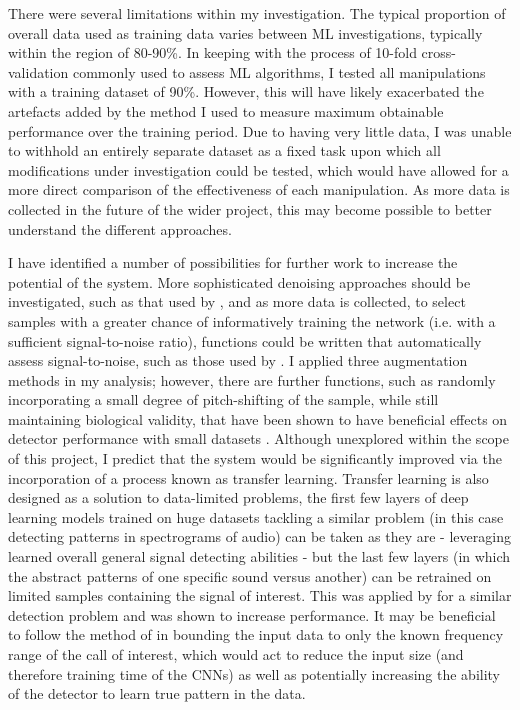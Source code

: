 \documentclass[11pt]{article}
\begin{document}
There were several limitations within my investigation. The typical proportion of overall data used as training data varies between ML investigations, typically within the region of 80-90\%. In keeping with the process of 10-fold cross-validation commonly used to assess ML algorithms, I tested all manipulations with a training dataset of 90\%. However, this will have likely exacerbated the artefacts added by the method I used to measure maximum obtainable performance over the training period. Due to having very little data, I was unable to withhold an entirely separate dataset as a fixed task upon which all modifications under investigation could be tested, which would have allowed for a more direct comparison of the effectiveness of each manipulation. As more data is collected in the future of the wider project, this may become possible to better understand the different approaches.

I have identified a number of possibilities for further work to increase the potential of the system. More sophisticated denoising approaches should be investigated, such as that used by \cite{versteegh2016classification}, and as more data is collected, to select samples with a greater chance of informatively training the network (i.e. with a sufficient signal-to-noise ratio), functions could be written that automatically assess signal-to-noise, such as those used by \cite{kahl2017large}. I applied three augmentation methods in my analysis; however, there are further functions, such as randomly incorporating a small degree of pitch-shifting of the sample, while still maintaining biological validity, that have been shown to have beneficial effects on detector performance with small datasets \citep{kahl2017large}.  Although unexplored within the scope of this project, I predict that the system would be significantly improved via the incorporation of a process known as transfer learning. Transfer learning is also designed as a solution to data-limited problems, the first few layers of deep learning models trained on huge datasets tackling a similar problem (in this case detecting patterns in spectrograms of audio) can be taken as they are - leveraging learned overall general signal detecting abilities - but the last few layers (in which the abstract patterns of one specific sound versus another) can be retrained on limited samples containing the signal of interest. This was applied by \cite{strout2017anuran} for a similar detection problem and was shown to increase performance. It may be beneficial to follow the method of \cite{mac2018bat} in bounding the input data to only the known frequency range of the call of interest, which would act to reduce the input size (and therefore training time of the CNNs) as well as potentially increasing the ability of the detector to learn true pattern in the data. 
\end{document}
